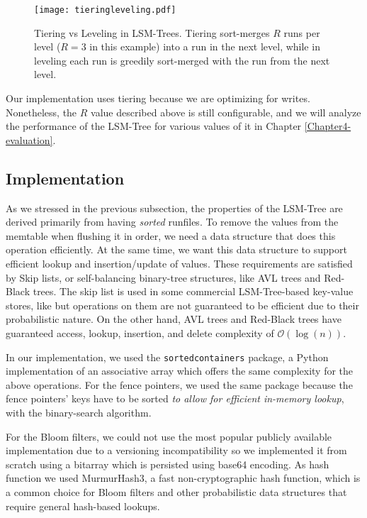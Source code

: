 \begin{figure}[h]
    \centering
    \texttt{[image: tieringleveling.pdf]}
    \caption{Tiering vs Leveling in LSM-Trees. Tiering sort-merges $R$ runs per level ($R=3$ in this example) into a run in the next level, while in leveling each run is greedily sort-merged with the run from the next level.}
    \label{fig:tiering-leveling}
\end{figure}

Our implementation uses tiering because we are optimizing for writes. Nonetheless, the $R$ value described above is still configurable, and we will analyze the performance of the LSM-Tree for various values of it in Chapter \ref{Chapter4-evaluation}.

\subsection{Implementation}

As we stressed in the previous subsection, the properties of the LSM-Tree are derived primarily from having \textit{sorted} runfiles.
To remove the values from the memtable when flushing it in order, we need a data structure that does this operation efficiently.
At the same time, we want this data structure to support efficient lookup and insertion/update of values.
These requirements are satisfied by Skip lists, or self-balancing binary-tree structures, like AVL trees and Red-Black trees. The skip list is used in some commercial LSM-Tree-based key-value stores, like \cite{leveldb} but operations on them are not guaranteed to be efficient due to their probabilistic nature. On the other hand, AVL trees and Red-Black trees have guaranteed access, lookup, insertion, and delete complexity of $\mathcal{O}(\log{}(n))$.

In our implementation, we used the \verb|sortedcontainers| package, a Python implementation of an associative array which offers the same complexity for the above operations. For the fence pointers, we used the same package because the fence pointers' keys have to be sorted \textit{to allow for efficient in-memory lookup}, with the binary-search algorithm.

For the Bloom filters, we could not use the most popular publicly available implementation due to a versioning incompatibility so we implemented it from scratch using a bitarray which is persisted using base64 encoding. As hash function we used MurmurHash3, a fast non-cryptographic hash function, which is a common choice for Bloom filters and other probabilistic data structures that require general hash-based lookups.

